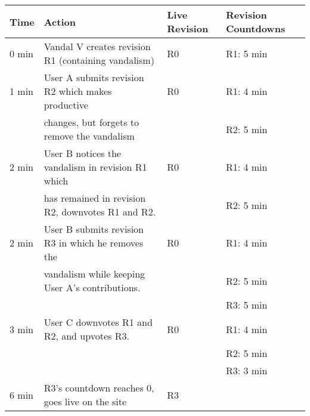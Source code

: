\begin{tabular}{l|l|l|l}\hline
\textbf{Time} & \textbf{Action} & \textbf{Live Revision} & \textbf{Revision Countdowns} \\
\hline
0 min & Vandal V creates revision R1 (containing vandalism) & R0 & R1: 5 min \\
\hline
1 min & User A submits revision R2 which makes productive  & R0 & R1: 4 min \\
&  changes, but forgets to remove the vandalism & & R2: 5 min \\
\hline
2 min & User B notices the vandalism in revision R1 which & R0 & R1: 4 min\\
& has remained in revision R2, downvotes R1 and R2. & &  R2: 5 min \\
\hline
2 min & User B submits revision R3 in which he removes the & R0 & R1: 4 min\\
& vandalism while keeping User A's contributions. &  & R2: 5 min \\
& & & R3: 5 min\\
\hline
3 min & User C downvotes R1 and R2, and upvotes R3. & R0 & R1: 4 min\\
& & & R2: 5 min\\
& & & R3: 3 min\\
\hline
6 min & R3's countdown reaches 0, goes live on the site & R3 & \\	
\hline
\end{tabular}
